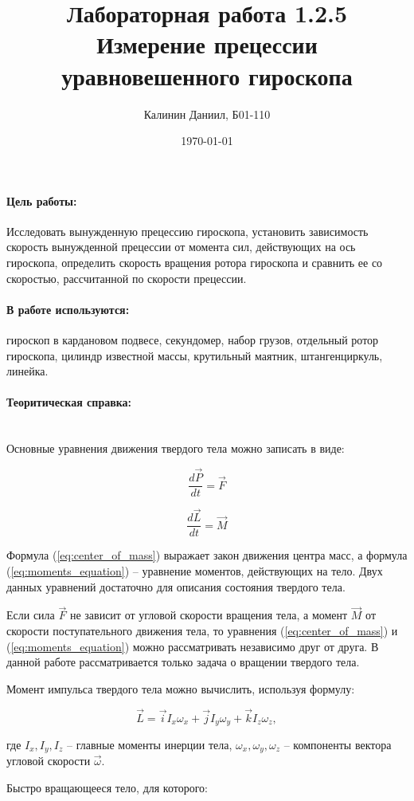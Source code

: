 \documentclass[a4paper, 12pt]{article}
\author{Калинин Даниил, Б01-110}
\date{\today}
\title{Лабораторная работа 1.2.5\\Измерение прецессии уравновешенного гироскопа}
\newcommand{\parag}[1]{\paragraph*{#1:}}
\begin{document}
\maketitle

\parag {Цель работы}
Исследовать вынужденную прецессию гироскопа, установить зависимость скорость вынужденной прецессии от момента сил, действующих на ось гироскопа, определить скорость вращения ротора гироскопа и сравнить ее со скоростью, рассчитанной по скорости прецессии.

\parag {В работе используются}
гироскоп в кардановом подвесе, секундомер, набор грузов, отдельный ротор гироскопа, цилиндр известной массы, крутильный маятник, штангенциркуль, линейка.

\parag {Теоритическая справка} ~\\

Основные уравнения движения твердого тела можно записать в виде:

\begin{equation}
	\frac{d\vec{P}}{dt} = \vec{F}
	\label{eq:center_of_mass}
\end{equation}

\begin{equation}
	\frac{d\vec{L}}{dt} = \vec{M}
	\label{eq:moments_equation}
\end{equation}

Формула (\ref{eq:center_of_mass}) выражает закон движения центра масс, а формула (\ref{eq:moments_equation}) -- уравнение моментов, действующих на тело. Двух данных уравнений достаточно для описания состояния твердого тела.

Если сила $\vec{F}$ не зависит от угловой скорости вращения тела, а момент $\vec{M}$ от скорости поступательного движения тела, то уравнения (\ref{eq:center_of_mass}) и (\ref{eq:moments_equation}) можно рассматривать независимо друг от друга. В данной работе рассматривается только задача о вращении твердого тела.

Момент импульса твердого тела можно вычислить, используя формулу:

\begin{equation}
	\vec{L} = \vec{i}I_{x}\omega_{x} + \vec{j}I_{y}\omega_{y} + \vec{k}I_{z}\omega_{z},
\end{equation}

где $ I_{x},I_{y},I_{z} $ -- главные моменты инерции тела, $ \omega_{x}, \omega_{y}, \omega_{z} $ -- компоненты вектора угловой скорости  $\vec{\omega} $.

Быстро вращающееся тело, для которого:
\end{document}
